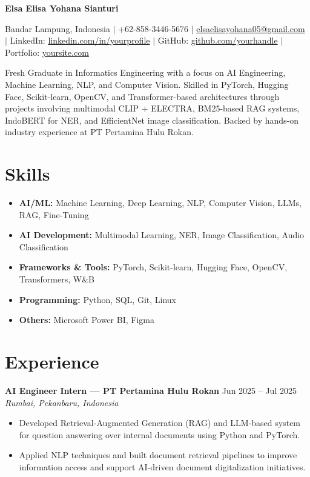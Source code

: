\documentclass[11pt,a4paper]{article}
\newcommand{\cvname}[1]{\begin{center}\LARGE\bfseries #1\end{center}}
\newcommand{\cvcontact}[1]{\begin{center}\small #1\end{center}}
\newcommand{\resumeSubheading}[4]{%
  \textbf{#1} \hfill #2 \\
  \textit{#3} \hfill \textit{#4}
}
\begin{document}
\cvname{Elsa Elisa Yohana Sianturi}
\cvcontact{Bandar Lampung, Indonesia $|$ +62-858-3446-5676 $|$ \href{mailto:elsaelisayohana05@gmail.com}{elsaelisayohana05@gmail.com} $|$ LinkedIn: \href{https://linkedin.com/in/yourprofile}{linkedin.com/in/yourprofile} $|$ GitHub: \href{https://github.com/yourhandle}{github.com/yourhandle} $|$ Portfolio: \href{https://yoursite.com}{yoursite.com}}

\vspace{0.4cm}

Fresh Graduate in Informatics Engineering with a focus on AI Engineering, Machine Learning, NLP, and Computer Vision. Skilled in PyTorch, Hugging Face, Scikit-learn, OpenCV, and Transformer-based architectures through projects involving multimodal CLIP + ELECTRA, BM25-based RAG systems, IndoBERT for NER, and EfficientNet image classification. Backed by hands-on industry experience at PT Pertamina Hulu Rokan.

\section*{Skills}
\begin{itemize}
  \item \textbf{AI/ML:} Machine Learning, Deep Learning, NLP, Computer Vision, LLMs, RAG, Fine-Tuning
  \item \textbf{AI Development:} Multimodal Learning, NER, Image Classification, Audio Classification
  \item \textbf{Frameworks \& Tools:} PyTorch, Scikit-learn, Hugging Face, OpenCV, Transformers, W\&B
  \item \textbf{Programming:} Python, SQL, Git, Linux
  \item \textbf{Others:} Microsoft Power BI, Figma
\end{itemize}

\section*{Experience}
\resumeSubheading{AI Engineer Intern — PT Pertamina Hulu Rokan}{Jun 2025 – Jul 2025}{Rumbai, Pekanbaru, Indonesia}{}
\begin{itemize}
  \item Developed Retrieval-Augmented Generation (RAG) and LLM-based system for question answering over internal documents using Python and PyTorch.
  \item Applied NLP techniques and built document retrieval pipelines to improve information access and support AI-driven document digitalization initiatives.
\end{itemize}
\end{document}
